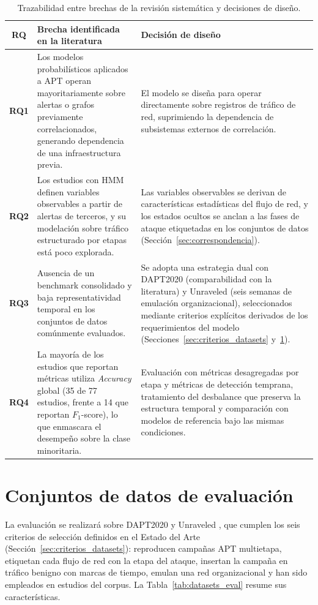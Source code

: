 \begin{table}[h!]
\centering
\small
\renewcommand{\arraystretch}{1.25}
\begin{tabular}{|c|p{6.5cm}|p{7cm}|}
\hline
\textbf{RQ} & \textbf{Brecha identificada en la literatura} & \textbf{Decisión de diseño} \\ \hline
\textbf{RQ1} & Los modelos probabilísticos aplicados a APT operan mayoritariamente sobre alertas o grafos previamente correlacionados, generando dependencia de una infraestructura previa. & El modelo se diseña para operar directamente sobre registros de tráfico de red, suprimiendo la dependencia de subsistemas externos de correlación. \\ \hline
\textbf{RQ2} & Los estudios con HMM definen variables observables a partir de alertas de terceros, y su modelación sobre tráfico estructurado por etapas está poco explorada. & Las variables observables se derivan de características estadísticas del flujo de red, y los estados ocultos se anclan a las fases de ataque etiquetadas en los conjuntos de datos (Sección~\ref{sec:correspondencia}). \\ \hline
\textbf{RQ3} & Ausencia de un benchmark consolidado y baja representatividad temporal en los conjuntos de datos comúnmente evaluados. & Se adopta una estrategia dual con DAPT2020 (comparabilidad con la literatura) y Unraveled (seis semanas de emulación organizacional), seleccionados mediante criterios explícitos derivados de los requerimientos del modelo (Secciones~\ref{sec:criterios_datasets} y~\ref{sec:datasets}). \\ \hline
\textbf{RQ4} & La mayoría de los estudios que reportan métricas utiliza \textit{Accuracy} global (35 de 77 estudios, frente a 14 que reportan $F_1$-score), lo que enmascara el desempeño sobre la clase minoritaria. & Evaluación con métricas desagregadas por etapa y métricas de detección temprana, tratamiento del desbalance que preserva la estructura temporal y comparación con modelos de referencia bajo las mismas condiciones. \\ \hline
\end{tabular}
\caption{Trazabilidad entre brechas de la revisión sistemática y decisiones de diseño.}
\label{tab:trazabilidad_brechas}
\end{table}
\FloatBarrier

\newpage
\section{Conjuntos de datos de evaluación}
\label{sec:datasets}
La evaluación se realizará sobre DAPT2020 \parencite{myneni2020dapt2020} y Unraveled \parencite{myneni2023unraveled}, que cumplen los seis criterios de selección definidos en el Estado del Arte (Sección~\ref{sec:criterios_datasets}): reproducen campañas APT multietapa, etiquetan cada flujo de red con la etapa del ataque, insertan la campaña en tráfico benigno con marcas de tiempo, emulan una red organizacional y han sido empleados en estudios del corpus. La Tabla~\ref{tab:datasets_eval} resume sus características.

